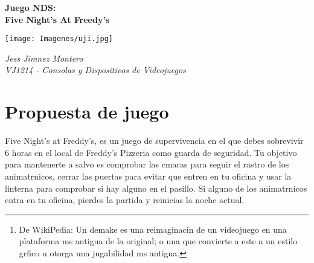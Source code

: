 \documentclass[12pt]{article}
\begin{document}
\nocite{namesans_about}
\nocite{namesans}
\nocite{namemono}
\nocite{seriouscode-gmbh-2022}
\nocite{carbon}
\nocite{fnaf_ai}
\nocite{fnaf_assets}
\nocite{fnaf_decomp}


  \begin{titlepage}
    \begin{center}
      \vspace{5cm}

      {\Huge \textbf{Juego NDS: \\
      Five Night's At Freedy's}}

      \vspace{2cm}

      \texttt{[image: Imagenes/uji.jpg]}

      \vspace{2cm}

      {\Large \textit{Jess Jimnez Montero}}\\
      \vspace{1cm}
      {\Large \textit{VJ1214 - Consolas y Dispositivos de Videojuegos}}\\

      \vspace{2cm}
    \end{center}
  \end{titlepage}

  \newpage


\begin{abstract}
  Este juego es un \textit{"demake"} \footnote{De WikiPedia: Un demake es una reimaginacin de un videojuego en una plataforma ms antigua de la original; o una que convierte a este a un estilo grfico u otorga una jugabilidad ms antigua.} del popular juego de PC: \textit{Five Night's At Freedy's}. La idea es realizar una adaptacin de FNAF a la Nintendo DS, tomando ventaja de las funciones que caracterizan a la NDS como la pantalla tctil y la portabilidad. Todo el juego est pensando para ejecutarse en una NDS real.
\end{abstract}
\newpage

\tableofcontents
\newpage

\listoffigures
\newpage


\section{Propuesta de juego}
  Five Night's at Freddy's, es un juego de supervivencia en el que debes sobrevivir 6 horas en el local de Freddy's Pizzeria como guarda de seguridad. Tu objetivo para mantenerte a salvo es comprobar las cmaras para seguir el rastro de los animatrnicos, cerrar las puertas para evitar que entren en tu oficina y usar la linterna para comprobar si hay alguno en el pasillo. Si alguno de los animatrnicos entra en tu oficina, pierdes la partida y reinicias la noche actual.\\
\end{document}
